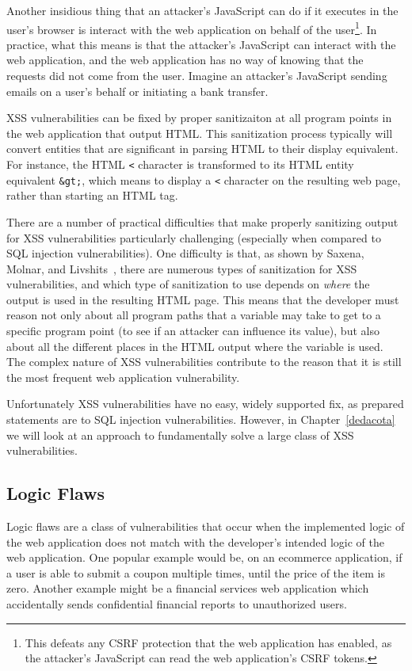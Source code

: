 Another insidious thing that an attacker's JavaScript can do if it
executes in the user's browser is interact with the web application on
behalf of the user\footnote{This defeats any CSRF protection that the
  web application has enabled, as the attacker's JavaScript can read
  the web application's CSRF tokens.}. In practice, what this means is
that the attacker's JavaScript can interact with the web application,
and the web application has no way of knowing that the requests did
not come from the user. Imagine an attacker's JavaScript sending
emails on a user's behalf or initiating a bank transfer.

XSS vulnerabilities can be fixed by proper sanitizaiton at all program
points in the web application that output HTML. This sanitization
process typically will convert entities that are significant in
parsing HTML to their display equivalent. For instance, the HTML
\texttt{<} character is transformed to its HTML entity equivalent
\texttt{\&gt;}, which means to display a \texttt{<} character on the
resulting web page, rather than starting an HTML tag.

There are a number of practical difficulties that make properly
sanitizing output for XSS vulnerabilities particularly challenging
(especially when compared to SQL injection vulnerabilities). One
difficulty is that, as shown by Saxena, Molnar, and
Livshits~\cite{saxena11:scriptgard}, there are numerous types of
sanitization for XSS vulnerabilities, and which type of sanitization
to use depends on \emph{where} the output is used in the resulting
HTML page. This means that the developer must reason not only about
all program paths that a variable may take to get to a specific
program point (to see if an attacker can influence its value), but
also about all the different places in the HTML output where the
variable is used. The complex nature of XSS vulnerabilities contribute
to the reason that it is still the most frequent web application
vulnerability.

Unfortunately XSS vulnerabilities have no easy, widely supported fix,
as prepared statements are to SQL injection vulnerabilities. However,
in Chapter~\ref{dedacota} we will look at an approach to fundamentally
solve a large class of XSS vulnerabilities.

\subsection{Logic Flaws}

Logic flaws are a class of vulnerabilities that occur when the
implemented logic of the web application does not match with the
developer's intended logic of the web application. One popular example
would be, on an ecommerce application, if a user is able to submit a
coupon multiple times, until the price of the item is zero. Another
example might be a financial services web application which
accidentally sends confidential financial reports to unauthorized
users. 

